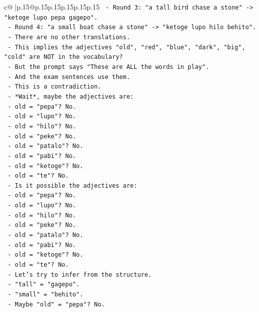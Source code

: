 \documentclass{article}
\begin{document}
{\begin{supertabular}{c@{$\;$}|p{.15\linewidth}@{}p{.15\linewidth}p{.15\linewidth}p{.15\linewidth}p{.15\linewidth}p{.15\linewidth}}
{{{\texttt{      {-} Round 3: "a tall bird chase a stone" {-}> "ketoge lupo pepa gagepo".} \\
\texttt{      {-} Round 4: "a small boat chase a stone" {-}> "ketoge lupo hilo behito".} \\
\texttt{      {-} There are no other translations.} \\
\texttt{      {-} This implies the adjectives "old", "red", "blue", "dark", "big", "cold" are NOT in the vocabulary?} \\
\texttt{      {-} But the prompt says "These are ALL the words in play".} \\
\texttt{      {-} And the exam sentences use them.} \\
\texttt{      {-} This is a contradiction.} \\
\texttt{      {-} *Wait*, maybe the adjectives are:} \\
\texttt{        {-} old = "pepa"? No.} \\
\texttt{        {-} old = "lupo"? No.} \\
\texttt{        {-} old = "hilo"? No.} \\
\texttt{        {-} old = "peke"? No.} \\
\texttt{        {-} old = "patalo"? No.} \\
\texttt{        {-} old = "pabi"? No.} \\
\texttt{        {-} old = "ketoge"? No.} \\
\texttt{        {-} old = "te"? No.} \\
\texttt{      {-} Is it possible the adjectives are:} \\
\texttt{        {-} old = "pepa"? No.} \\
\texttt{        {-} old = "lupo"? No.} \\
\texttt{        {-} old = "hilo"? No.} \\
\texttt{        {-} old = "peke"? No.} \\
\texttt{        {-} old = "patalo"? No.} \\
\texttt{        {-} old = "pabi"? No.} \\
\texttt{        {-} old = "ketoge"? No.} \\
\texttt{        {-} old = "te"? No.} \\
\texttt{      {-} Let's try to infer from the structure.} \\
\texttt{      {-} "tall" = "gagepo".} \\
\texttt{      {-} "small" = "behito".} \\
\texttt{      {-} Maybe "old" = "pepa"? No.} \\
}}}
\end{supertabular}}
\end{document}
